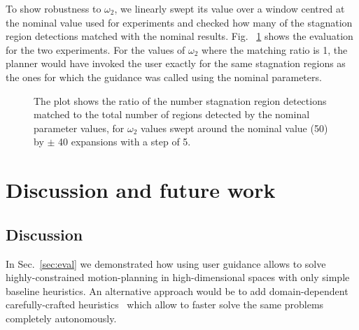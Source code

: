 \documentclass{article}
\begin{document}
To show robustness to $\omega_2$, we linearly swept its value over a window centred at the nominal value used for experiments and checked how many of the stagnation region detections matched with the nominal results. Fig. ~\ref{fig:robustness} shows the evaluation for the two experiments. For the values of $\omega_2$ where the matching ratio is 1, the planner would have invoked the user exactly for the same stagnation regions as the ones for which the guidance was called using the nominal parameters.

\begin{figure}[t]%
  \centering%
  \hspace{-2mm}
%

  \caption{%
    The plot shows the ratio of the number stagnation region detections matched to the total number of regions detected by the nominal parameter values, for $\omega_2$ values swept around the nominal value (50) by $\pm$ 40 expansions with a step of 5. 
  \vspace{-5mm}
}
   	\label{fig:robustness}
\end{figure}

\section{Discussion and future work}
\label{sec:future}

\subsection{Discussion}
In Sec.~\ref{sec:eval} we demonstrated how using user guidance allows to solve highly-constrained motion-planning in high-dimensional spaces with only simple baseline heuristics.
An alternative approach would be to add domain-dependent carefully-crafted heuristics~\cite{V17} which allow to faster solve the same problems completely autonomously.
\end{document}
